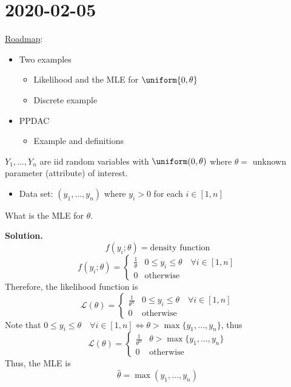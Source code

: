 \section{2020-02-05}
\underline{Roadmap}:
\begin{itemize}
    \item Two examples
          \begin{itemize}
              \item Likelihood and the MLE for $ \uniform{0,\theta} $
              \item Discrete example
          \end{itemize}
    \item PPDAC
          \begin{itemize}
              \item Example and definitions
          \end{itemize}
\end{itemize}

\begin{Example}{}{}
    $ Y_1,\ldots ,Y_n $ are iid random variables with $ \uniform(0,\theta) $
    where $ \theta= $ unknown parameter (attribute) of interest.
    \begin{itemize}
        \item Data set: $ (y_1,\ldots ,y_n) $ where $ y_i>0 $ for each $ i\in[1,n] $
    \end{itemize}
    What is the MLE for $ \theta $.

    \textbf{Solution.}
    \[ f(y_i;\theta)=\text{density function} \]
    \[ f(y_i;\theta)=
        \begin{cases}
            \frac{1}{\theta} & 0\leqslant y_i \leqslant \theta\quad\forall i\in[1,n] \\
            0                & \text{otherwise}
        \end{cases} \]
    Therefore, the likelihood function is
    \[ \mathcal{L}(\theta)=
        \begin{cases}
            \frac{1}{\theta^n} & 0\leqslant y_i\leqslant \theta\quad\forall i\in[1,n] \\
            0                  & \text{otherwise}
        \end{cases} \]
    Note that $ 0\leqslant y_i\leqslant \theta\quad\forall i\in[1,n]\iff
        \theta>\max\{y_1,\ldots ,y_n\} $, thus
    \[ \mathcal{L}(\theta)=
        \begin{cases}
            \frac{1}{\theta^n} & \theta>\max \{y_1,\ldots ,y_n\} \\
            0                  & \text{otherwise}
        \end{cases} \]
    Thus, the MLE is
    \[ \hat{\theta}=\max(y_1,\ldots ,y_n) \]
\end{Example}



